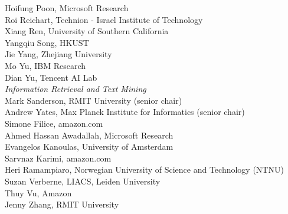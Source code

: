 \hspace*{0.2in} Hoifung Poon, Microsoft Research\\
\hspace*{0.2in} Roi Reichart, Technion - Israel Institute of Technology\\
\hspace*{0.2in} Xiang Ren, University of Southern California\\
\hspace*{0.2in} Yangqiu Song, HKUST\\
\hspace*{0.2in} Jie Yang, Zhejiang University\\
\hspace*{0.2in} Mo Yu, IBM Research\\
\hspace*{0.2in} Dian Yu, Tencent AI Lab\\

\emph{Information Retrieval and Text Mining} \\
\hspace*{0.2in} Mark Sanderson, RMIT University (senior chair)\\
\hspace*{0.2in} Andrew Yates, Max Planck Institute for Informatics (senior chair)\\
\hspace*{0.2in} Simone Filice, amazon.com\\
\hspace*{0.2in} Ahmed Hassan Awadallah, Microsoft Research\\
\hspace*{0.2in} Evangelos Kanoulas, University of Amsterdam\\
\hspace*{0.2in} Sarvnaz Karimi, amazon.com\\
\hspace*{0.2in} Heri Ramampiaro, Norwegian University of Science and Technology (NTNU)\\
\hspace*{0.2in} Suzan Verberne, LIACS, Leiden University\\
\hspace*{0.2in} Thuy Vu, Amazon\\
\hspace*{0.2in} Jenny Zhang, RMIT University\\


